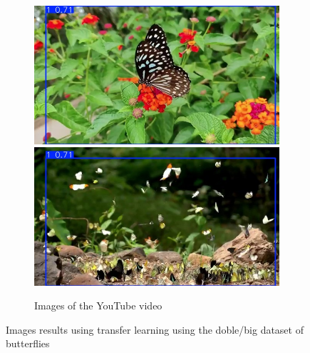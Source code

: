 \documentclass{cpsc202}
\begin{document}
\begin{figure}
        \begin{subfigure}{.9\textwidth}
            \centering
            \includegraphics[width=.4\linewidth]{trained_bigger_butterflies/photogram_16}
            \includegraphics[width=.4\linewidth]{trained_bigger_butterflies/photogram_93}
            \caption{Images of the YouTube video}
            \label{fig:video-trained_bigger_butterflies}
        \end{subfigure}
        \caption{Images results using transfer learning using the doble/big dataset of butterflies}
        \label{fig:trained_bigger_butterflies}
    \end{figure}
\end{document}
